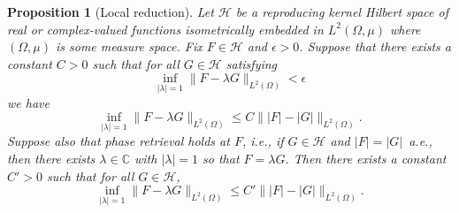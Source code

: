 \documentclass[11pt]{amsart}
\newtheorem{proposition}[theorem]{Proposition}
\theoremstyle{remark}
\begin{document}
\begin{proposition}[Local reduction]\label{prop:local-reduction}
Let \(\mathcal{H}\) be a reproducing kernel Hilbert space of real or complex-valued
functions isometrically embedded in \(L^2(\Omega,\mu)\) where $(\Omega,\mu)$ is some measure space. Fix \(F\in \mathcal{H}\) and
\(\epsilon>0\). Suppose that there exists a constant \(C>0\) such that for
all \(G\in \mathcal{H}\) satisfying
\[
\inf_{\lvert \lambda \rvert=1}\lVert F-\lambda G \rVert_{L^2(\Omega)}<\epsilon
\]
we have
\[
\inf_{\lvert \lambda \rvert=1}\lVert F-\lambda G \rVert_{L^2(\Omega)}
\le
C\lVert \lvert F \rvert-\lvert G \rvert \rVert_{L^2(\Omega)}.
\]
Suppose also that phase retrieval holds at \(F\), i.e., if \(G\in \mathcal{H}\) and
\(\lvert F \rvert=\lvert G \rvert\)~a.e., then there exists \(\lambda\in\mathbb{C}\) with
\(\lvert \lambda \rvert=1\) so that \(F=\lambda G\). Then there exists a constant
\(C'>0\) such that for all \(G\in \mathcal{H}\),
\[
\inf_{\lvert \lambda \rvert=1}\lVert F-\lambda G \rVert_{L^2(\Omega)}
\le
C'\lVert \lvert F \rvert-\lvert G \rvert \rVert_{L^2(\Omega)}.
\]
\end{proposition}
\end{document}
